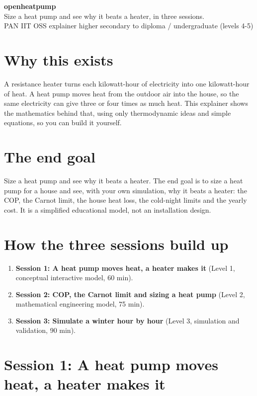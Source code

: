 \documentclass[11pt,a4paper]{article}
\begin{document}
\begin{center}{\LARGE\bfseries openheatpump}\\[0.4em]{\large Size a heat pump and see why it beats a heater, in three sessions.}\\[0.2em]\small PAN IIT OSS explainer \textbullet{} higher secondary to diploma / undergraduate (levels 4-5)\end{center}

\section*{Why this exists}
A resistance heater turns each kilowatt-hour of electricity into one kilowatt-hour of heat. A heat pump moves heat from the outdoor air into the house, so the same electricity can give three or four times as much heat. This explainer shows the mathematics behind that, using only thermodynamic ideas and simple equations, so you can build it yourself.

\section*{The end goal}
Size a heat pump and see why it beats a heater. The end goal is to size a heat pump for a house and see, with your own simulation, why it beats a heater: the COP, the Carnot limit, the house heat loss, the cold-night limits and the yearly cost. It is a simplified educational model, not an installation design.

\section*{How the three sessions build up}
\begin{enumerate}[nosep]
\item \textbf{Session 1: A heat pump moves heat, a heater makes it} (Level 1, conceptual interactive model, 60 min).
\item \textbf{Session 2: COP, the Carnot limit and sizing a heat pump} (Level 2, mathematical engineering model, 75 min).
\item \textbf{Session 3: Simulate a winter hour by hour} (Level 3, simulation and validation, 90 min).
\end{enumerate}

\section{Session 1: A heat pump moves heat, a heater makes it}
\end{document}
